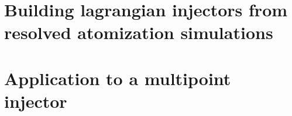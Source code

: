 \documentclass[twoside]{report}
\begin{document}
\part{Building lagrangian injectors from resolved atomization simulations}

\newpage 

\newpage

\newpage

\part{Application to a multipoint injector}
%

\newpage

\newpage
%

%

\newpage

%



\fancyhead[LO]{}
\nocite{*}


%
%
%
\end{document}
